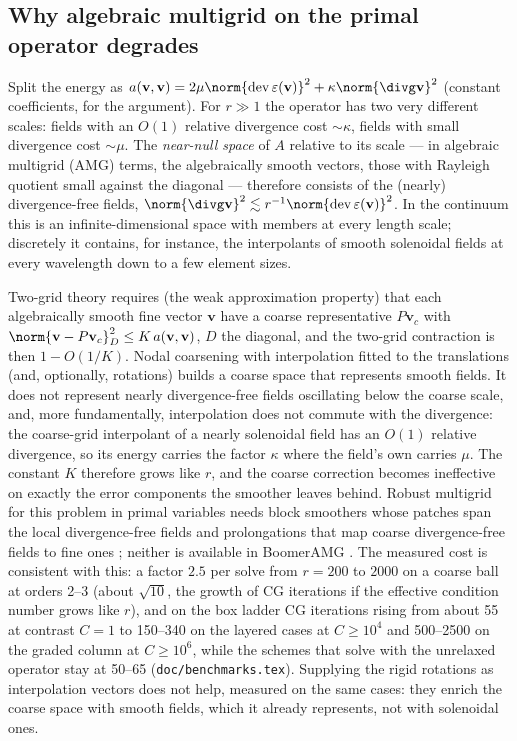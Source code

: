 \documentclass[11pt]{article}
\numberwithin{equation}{section}
\theoremstyle{remark}
\newcommand{\eps}{\varepsilon}
\newcommand{\dev}{\operatorname{dev}}
\newcommand{\vv}{\mathbf{v}}
\newcommand{\code}[1]{\texttt{#1}}
\begin{document}
\subsection{Why algebraic multigrid on the primal operator degrades}
\label{sec:amg}

Split the energy as $a(\vv,\vv) = 2\mu\norm{\dev\eps(\vv)}^2 +
\kappa\norm{\divg\vv}^2$ (constant coefficients, for the argument). For
$r\gg1$ the operator has two very different scales: fields with an
$O(1)$ relative divergence cost $\sim\kappa$, fields with small divergence
cost $\sim\mu$. The \emph{near-null space} of $A$ relative to its scale
--- in algebraic multigrid (AMG) terms, the algebraically smooth vectors,
those with Rayleigh quotient small against the diagonal --- therefore
consists of the (nearly) divergence-free fields, $\norm{\divg\vv}^2\lesssim
r^{-1}\norm{\dev\eps(\vv)}^2$. In the continuum this is an
infinite-dimensional space with members at every length scale; discretely
it contains, for instance, the interpolants of smooth solenoidal fields at
every wavelength down to a few element sizes.

Two-grid theory requires (the weak approximation property) that each
algebraically smooth fine vector $\vv$ have a coarse representative
$P\vv_c$ with $\norm{\vv - P\vv_c}_{D}^2 \le K\,a(\vv,\vv)$, $D$ the
diagonal, and the two-grid contraction is then $1 - O(1/K)$. Nodal
coarsening with interpolation fitted to the translations (and, optionally,
rotations) builds a coarse space that represents smooth fields. It does
not represent nearly divergence-free fields oscillating below the coarse
scale, and, more fundamentally, interpolation does not commute with the
divergence: the coarse-grid interpolant of a nearly solenoidal field has
an $O(1)$ relative divergence, so its energy carries the factor $\kappa$
where the field's own carries $\mu$. The constant $K$ therefore grows like
$r$, and the coarse correction becomes ineffective on exactly the error
components the smoother leaves behind. Robust multigrid for this problem
in primal variables needs block smoothers whose patches span the local
divergence-free fields and prolongations that map coarse
divergence-free fields to fine ones \cite{Schoberl1999,LWXZ2007}; neither
is available in BoomerAMG \cite{HensonYang2002}. The measured cost is
consistent with this: a factor $2.5$ per solve from $r = 200$ to $2000$ on
a coarse ball at orders 2--3 (about $\sqrt{10}$, the growth of CG
iterations if the effective condition number grows like $r$), and on the
box ladder CG iterations rising from about 55 at contrast $C = 1$ to
150--340 on the layered cases at $C\ge10^4$ and 500--2500 on the graded
column at $C\ge10^6$, while the schemes that solve with the unrelaxed
operator stay at 50--65 (\code{doc/benchmarks.tex}). Supplying the rigid
rotations as interpolation vectors does not help, measured on the same
cases: they enrich the coarse space with
smooth fields, which it already represents, not with solenoidal ones.
\end{document}
